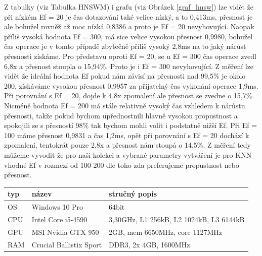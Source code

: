 \documentclass[czech,semestral,dept460,male,csharp,cpdeclaration]{diploma}
\begin{document}
		Z tabulky (viz Tabulka {HNSWM}) i grafu (viz Obrázek \ref{graf_hnsw}) lze vidět že při nízkém Ef = 20 je čas dotazování také velice nízký, a to 0,413ms, přesnost je ale bohužel rovněž až moc nízká 0,8386 a proto je Ef = 20 nevyhovující. Naopak příliš vysoká hodnota Ef = 300, má sice velice vysokou přesnost 0,9980, bohužel čas operace je v tomto případě zbytečně příliš vysoký 2,8ms na to jaký nárůst přesnosti získáme. Pro představu oproti Ef = 20, se u Ef = 300 čas operace zvedl 6,8x a přesnost stoupla o 15,94\%. Proto je i Ef = 300 nevyhovující. Z měření lze vidět že ideální hodnota Ef pokud nám závisí na přesnosti nad 99,5\% je okolo 200, získáváme vysokou přesnost 0,9957 za přijatelný čas vykonání operace 1,9ms. Při porovnání s Ef = 20, dojde k 4,8x zpomalení ale přesnost se zvedne o 15,7\%. Nicméně hodnota Ef = 200 má stále relativně vysoký čas vzhledem k nárůstu přesnosti, takže pokud bychom upřednostnili hlavně vysokou propustnost a spokojili se s přesností 98\% tak bychom mohli volit i podstatně nižší Ef. Při Ef = 100 máme přesnost 0,9831 a čas 1,2ms, opět při porovnání s Ef = 20 dochází k zpomalení, tentokrát pouze 2,8x a přesnost nám stoupá o 14,5\%. Z měření tedy můžeme vyvodit že pro naši kolekci a vybrané parametry vytváření je pro KNN vhodné Ef v rozmezí od 100-200 dle toho zda preferujeme propustnost nebo přesnost.
		
		\begin{center}
			\begin{tabular}{l | l | l}
				
				typ & název & stručný popis \\
				\midrule
				OS & Windows 10 Pro & 64bit \\
				CPU & Intel Core i5-4590 & 3,30GHz, L1 256kB, L2 1024kB, L3 6144kB\\
				GPU & MSI Nvidia GTX 950 & 2GB, mem 6650MHz, core 1127MHz\\
				RAM & Crucial Ballistix Sport & DDR3, 2x 4GB, 1600MHz\\
				
			\end{tabular}
			\label{my_pc}
		\end{center}
		
		\newpage
		
\end{document}
